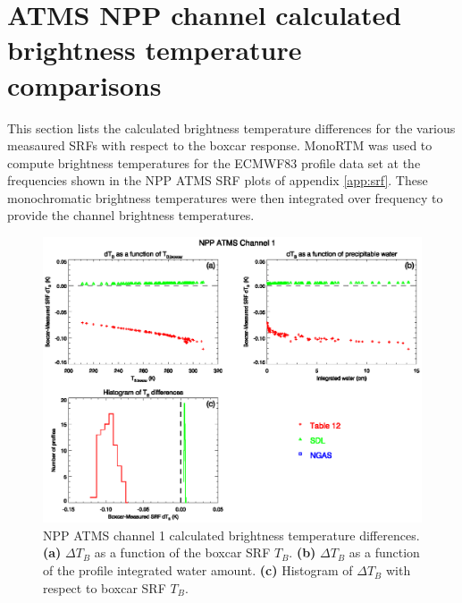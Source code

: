 \section{ATMS NPP channel calculated brightness temperature comparisons}
\label{app:dtb}
This section lists the calculated brightness temperature differences for the various measaured SRFs with respect to the boxcar response. MonoRTM \cite{Clough_2005} was used to compute brightness temperatures for the ECMWF83 profile data set \cite{ECMWF_profile_set2,Matricardi_ECMWF564} at the frequencies shown in the NPP ATMS SRF plots of appendix \ref{app:srf}. These monochromatic brightness temperatures were then integrated over frequency to provide the channel brightness temperatures.

\clearpage


\begin{figure}[H]
  \centering
  \includegraphics[scale=1]{graphics/dtb/atms_npp.ch1.TbStats.eps}
  \caption{NPP ATMS channel 1 calculated brightness temperature differences. \textbf{(a)} $\Delta T_B$ as a function of the boxcar SRF $T_B$. \textbf{(b)} $\Delta T_B$ as a function of the profile integrated water amount. \textbf{(c)} Histogram of $\Delta T_B$ with respect to boxcar SRF $T_B$.}
  \label{fig:atms_npp.ch1.dtb}
\end{figure}

